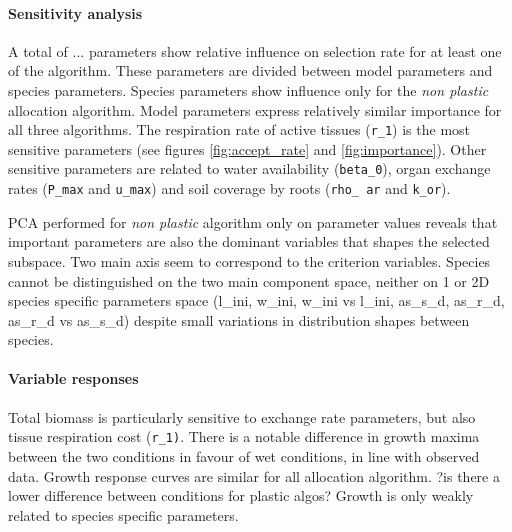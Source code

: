 
\paragraph{Sensitivity analysis}

A total of ... parameters show relative influence on selection rate for at least one of the algorithm. These parameters are divided between model parameters and species parameters. Species parameters show influence only for the \textit{non plastic }allocation algorithm. Model parameters express relatively similar importance for all three algorithms. The respiration rate of active tissues (\texttt{r\_1}) is the most sensitive parameters (see figures \ref{fig:accept_rate} and \ref{fig:importance}). Other sensitive parameters are related to water availability (\texttt{beta\_0}), organ exchange rates (\texttt{P\_max} and \texttt{u\_max}) and soil coverage by roots (\texttt{rho\_ ar} and \texttt{k\_or}).



PCA performed for \textit{non plastic} algorithm only on parameter values reveals that important parameters are also the dominant variables that shapes the selected subspace. Two main axis seem to correspond to the criterion variables. Species cannot be distinguished on the two main component space, neither on 1 or 2D species specific parameters space (l\_ini, w\_ini, w\_ini vs l\_ini, as\_s\_d, as\_r\_d, as\_r\_d vs as\_s\_d) despite small variations in distribution shapes between species.\\

\paragraph{Variable responses}
Total biomass is particularly sensitive to exchange rate parameters, but also tissue respiration cost (\texttt{r\_1)}. There is a notable difference in growth maxima between the two conditions in favour of wet conditions, in line with observed data.  Growth response curves are similar for all allocation algorithm. ?is there a lower difference between conditions for plastic algos? Growth is only weakly related to species specific parameters.\\

